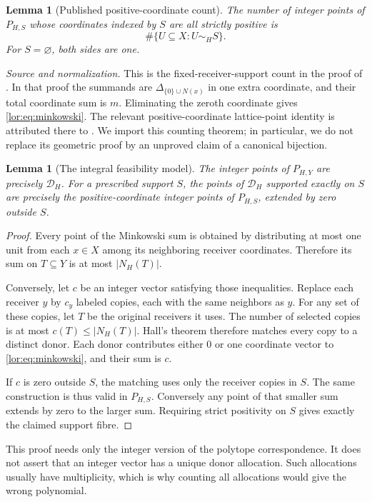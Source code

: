 \documentclass[11pt]{article}
\numberwithin{equation}{section}
\newtheorem{lemma}[theorem]{Lemma}
\theoremstyle{definition}
\newcommand{\cD}{\mathcal D}
\begin{document}
\begin{lemma}[Published positive-coordinate count]\label{lor:lem:externalbridge}
The number of integer points of $P_{H,S}$ whose coordinates indexed by
$S$ are all strictly positive is
\begin{equation}
 \#\{U\subseteq X: U\sim_H S\}.
 \label{lor:eq:positivecount}
\end{equation}
For $S=\varnothing$, both sides are one.
\end{lemma}
\noindent\emph{Source and normalization.}
This is the fixed-receiver-support count in the proof of
\cite[Proposition~3.4]{OT20}. In that proof the summands are
$\Delta_{\{0\}\cup N(x)}$ in one extra coordinate, and their total coordinate
sum is $m$. Eliminating the zeroth coordinate gives
\eqref{lor:eq:minkowski}. The relevant positive-coordinate lattice-point
identity is attributed there to \cite[Lemma~22 and Proposition~26]{Oh}.
We import this counting theorem; in particular, we do not replace its
geometric proof by an unproved claim of a canonical bijection.

\begin{lemma}[The integral feasibility model]\label{lor:lem:hallmodel}
The integer points of $P_{H,Y}$ are precisely $\cD_H$.
For a prescribed support $S$, the points of $\cD_H$ supported exactly on
$S$ are precisely the positive-coordinate integer points of $P_{H,S}$,
extended by zero outside $S$.
\end{lemma}
\begin{proof}
Every point of the Minkowski sum is obtained by distributing at most one
unit from each $x\in X$ among its neighboring receiver coordinates.
Therefore its sum on $T\subseteq Y$ is at most $|N_H(T)|$.

Conversely, let $c$ be an integer vector satisfying those inequalities.
Replace each receiver $y$ by $c_y$ labeled copies, each with the same
neighbors as $y$. For any set of these copies, let $T$ be the original
receivers it uses. The number of selected copies is at most
$c(T)\le |N_H(T)|$. Hall's theorem therefore matches every copy to a
distinct donor. Each donor contributes either $0$ or one coordinate vector
to \eqref{lor:eq:minkowski}, and their sum is $c$.

If $c$ is zero outside $S$, the matching uses only the receiver copies in
$S$. The same construction is thus valid in $P_{H,S}$. Conversely any
point of that smaller sum extends by zero to the larger sum. Requiring
strict positivity on $S$ gives exactly the claimed support fibre.
\end{proof}
This proof needs only the integer version of the polytope correspondence.
It does not assert that an integer vector has a unique donor allocation.
Such allocations usually have multiplicity, which is why counting all
allocations would give the wrong polynomial.
\end{document}
